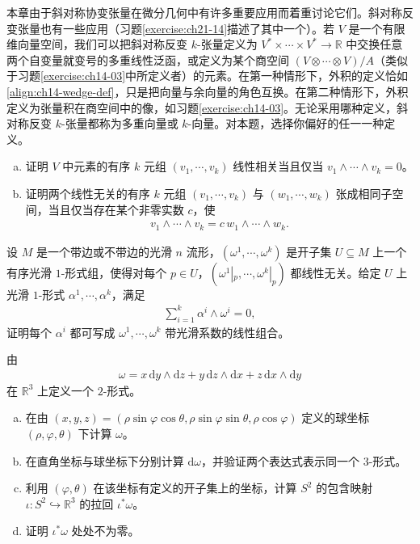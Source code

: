 \documentclass[../../main.tex]{subfiles}
\begin{document}
\begin{exercise}\label{exercise:ch14-04b}
本章由于斜对称协变张量在微分几何中有许多重要应用而着重讨论它们。斜对称反变张量也有一些应用（习题\ref{exercise:ch21-14}描述了其中一个）。若 $V$ 是一个有限维向量空间，我们可以把斜对称反变 $k$-张量定义为 $V^*\times\cdots\times V^*\to\mathbb{R}$ 中交换任意两个自变量就变号的多重线性泛函，或定义为某个商空间 $(V\otimes\cdots\otimes V)/A$（类似于习题\ref{exercise:ch14-03}中所定义者）的元素。在第一种情形下，外积的定义恰如\eqref{align:ch14-wedge-def}，只是把向量与余向量的角色互换。在第二种情形下，外积定义为张量积在商空间中的像，如习题\ref{exercise:ch14-03}。无论采用哪种定义，斜对称反变 $k$-张量都称为多重向量或 $k$-向量。对本题，选择你偏好的任一一种定义。
\begin{enumerate}[(a)]
\item 证明 $V$ 中元素的有序 $k$ 元组 $(v_1,\cdots ,v_k)$ 线性相关当且仅当 $v_1\wedge\cdots\wedge v_k=0$。
\item 证明两个线性无关的有序 $k$ 元组 $(v_1,\cdots ,v_k)$ 与 $(w_1,\cdots ,w_k)$ 张成相同子空间，当且仅当存在某个非零实数 $c$，使
\begin{align*}
v_1\wedge\cdots\wedge v_k=c\,w_1\wedge\cdots\wedge w_k.
\end{align*}
\end{enumerate}
\end{exercise}

\begin{exercise}[Cartan 引理]\label{exercise:ch14-05}
设 $M$ 是一个带边或不带边的光滑 $n$ 流形，$(\omega^1,\cdots ,\omega^k)$ 是开子集 $U\subseteq M$ 上一个有序光滑 $1$-形式组，使得对每个 $p\in U$，$(\omega^1|_p,\cdots ,\omega^k|_p)$ 都线性无关。给定 $U$ 上光滑 $1$-形式 $\alpha^1,\cdots ,\alpha^k$，满足
\begin{align*}
\sum_{i=1}^k\alpha^i\wedge\omega^i=0,
\end{align*}
证明每个 $\alpha^i$ 都可写成 $\omega^1,\cdots ,\omega^k$ 带光滑系数的线性组合。
\end{exercise}

\begin{exercise}\label{exercise:ch14-06}
由
\begin{align*}
\omega=x\,\mathrm{d}y\wedge\mathrm{d}z+y\,\mathrm{d}z\wedge\mathrm{d}x+z\,\mathrm{d}x\wedge\mathrm{d}y
\end{align*}
在 $\mathbb{R}^3$ 上定义一个 $2$-形式。
\begin{enumerate}[(a)]
\item 在由 $(x,y,z)=(\rho\sin\varphi\cos\theta,\rho\sin\varphi\sin\theta,\rho\cos\varphi)$ 定义的球坐标 $(\rho,\varphi,\theta)$ 下计算 $\omega$。
\item 在直角坐标与球坐标下分别计算 $\mathrm{d}\omega$，并验证两个表达式表示同一个 $3$-形式。
\item 利用 $(\varphi,\theta)$ 在该坐标有定义的开子集上的坐标，计算 $S^2$ 的包含映射 $\iota:S^2\hookrightarrow\mathbb{R}^3$ 的拉回 $\iota^*\omega$。
\item 证明 $\iota^*\omega$ 处处不为零。
\end{enumerate}
\end{exercise}
\end{document}
